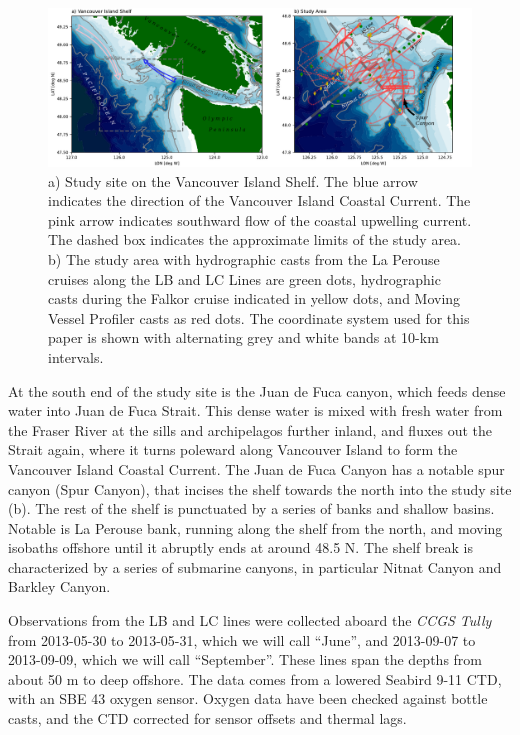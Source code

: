 \documentclass[draft]{agujournal2019}
\begin{document}
\begin{figure}[htbp]
  \includegraphics[width=5in]{LocMapBoth.pdf}
  \caption{a) Study site on the Vancouver Island Shelf.  The blue arrow indicates the direction of the Vancouver Island Coastal Current.  The pink arrow indicates southward flow of the coastal upwelling current.  The dashed box indicates the approximate limits of the study area.  b) The study area with hydrographic casts from the La Perouse cruises along the LB and LC Lines are green dots, hydrographic casts during the Falkor cruise indicated in yellow dots, and Moving Vessel Profiler casts as red dots.  The coordinate system used for this paper is shown with alternating grey and white bands at 10-km intervals.}
  \label{fig:LocMapBoth}
\end{figure}


At the south end of the study site is the Juan de Fuca canyon, which feeds dense water into Juan de Fuca Strait.  This dense water is mixed with fresh water from the Fraser River at the sills and archipelagos further inland, and fluxes out the Strait again, where it turns poleward along Vancouver Island to form the Vancouver Island Coastal Current.  The Juan de Fuca Canyon has a notable spur canyon (Spur Canyon), that incises the shelf towards the north into the study site (b).  The rest of the shelf is punctuated by a series of banks and shallow basins.  Notable is La Perouse bank, running along the shelf from the north, and moving isobaths offshore until it abruptly ends at around 48.5 N. The shelf break is characterized by a series of submarine canyons, in particular Nitnat Canyon and Barkley Canyon.


Observations from the LB and LC lines were collected aboard the \emph{CCGS Tully} from 2013-05-30 to 2013-05-31, which we will call ``June'', and 2013-09-07 to 2013-09-09, which we will call ``September''.  These lines span the depths from about 50 m to deep offshore.  The data comes from a lowered Seabird 9-11 CTD, with an SBE 43 oxygen sensor.  Oxygen data have been checked against bottle casts, and the CTD corrected for sensor offsets and thermal lags.
\end{document}
